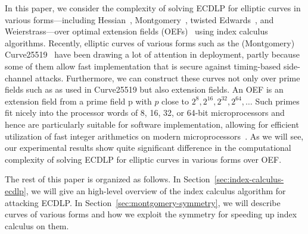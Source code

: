 In this paper, we consider the complexity of solving ECDLP for
elliptic curves in various forms---including
Hessian~\cite{DBLP:conf/ches/Smart01},
Montgomery~\cite{1987-montgomery}, twisted
Edwards~\cite{DBLP:journals/iacr/BernsteinBJLP08}, and
Weierstrass---over optimal extension fields
(OEFs)~\cite{DBLP:conf/crypto/BaileyP98} using index calculus
algorithms.
%
Recently, elliptic curves of various forms such as the (Montgomery)
Curve25519~\cite{DBLP:conf/pkc/Bernstein06} have been drawing a lot of
attention in deployment, partly because some of them allow fast
implementation that is secure against timing-based side-channel
attacks.
%
Furthermore, we can construct these curves not only over prime fields
such as  as used in Curve25519 but also extension
fields.
%
An OEF is an extension field from a prime field \F p with $p$ close to
$2^8, 2^{16}, 2^{32}, 2^{64}, \ldots$
%
Such primes fit nicely into the processor words of 8, 16, 32, or
64-bit microprocessors and hence are particularly suitable for
software implementation, allowing for efficient utilization of fast
integer arithmetics on modern
microprocessors~\cite{DBLP:conf/crypto/BaileyP98}.
%
As we will see, our experimental results show quite significant
difference in the computational complexity of solving ECDLP for
elliptic curves in various forms over OEF.

The rest of this paper is organized as follows.
%
In Section~\ref{sec:index-calculus-ecdlp}, we will give an high-level
overview of the index calculus algorithm for attacking ECDLP.
%
In Section~\ref{sec:montgomery-symmetry}, we will describe curves of
various forms and how we exploit the symmetry for speeding up index
calculus on them.
